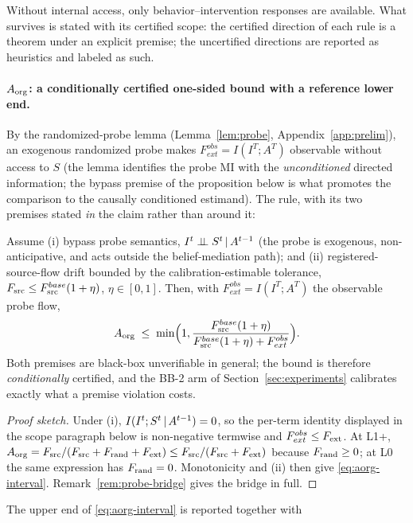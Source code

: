 Without internal access, only behavior--intervention responses are available.
What survives is stated with its certified scope: the certified direction of
each rule is a theorem under an explicit premise; the uncertified directions
are reported as heuristics and labeled as such.

\paragraph{$A_{\mathrm{org}}$: a conditionally certified one-sided bound with a
reference lower end.}
By the randomized-probe lemma
(Lemma~\ref{lem:probe}, Appendix~\ref{app:prelim}), an exogenous randomized
probe makes $F_{ext}^{obs}=I(I^T;A^T)$ observable without access to $S$
(the lemma identifies the probe MI with the \emph{unconditioned} directed
information; the bypass premise of the proposition below is what promotes
the comparison to the causally conditioned estimand). The rule, with its two
premises stated \emph{in} the claim rather than around it:
\begin{proposition}\label{prop:certified-bound}
Assume \textup{(i)} bypass probe semantics, $I^t\perp\!\!\!\perp S^t\,|\, A^{t-1}$
(the probe is exogenous, non-anticipative, and acts outside the
belief-mediation path); and \textup{(ii)} registered-source-flow drift bounded by the
calibration-estimable tolerance, $F_{\mathrm{src}}\le F_{\mathrm{src}}^{base}(1+\eta)$,
$\eta\in[0,1]$. Then, with $F_{ext}^{obs}=I(I^T;A^T)$ the observable probe
flow,
\begin{equation}\label{eq:aorg-interval}
A_{\mathrm{org}}\;\le\;
\min\Bigl(1,\frac{F_{\mathrm{src}}^{base}(1+\eta)}{F_{\mathrm{src}}^{base}(1+\eta)+F_{ext}^{obs}}\Bigr).
\end{equation}
Both premises are black-box unverifiable in general; the bound is therefore
\emph{conditionally} certified, and the BB-2 arm of
Section~\ref{sec:experiments} calibrates exactly what a premise violation
costs.
\end{proposition}
\begin{proof}[Proof sketch]
Under (i), $I(I^t;S^t\,|\, A^{t-1})=0$, so the per-term identity displayed
in the scope paragraph below is non-negative termwise and
$F_{ext}^{obs}\le F_{\mathrm{ext}}$. At L1+,
$A_{\mathrm{org}}=F_{\mathrm{src}}/(F_{\mathrm{src}}+F_{\mathrm{rand}}+F_{\mathrm{ext}})\le F_{\mathrm{src}}/(F_{\mathrm{src}}+F_{\mathrm{ext}})$ because
$F_{\mathrm{rand}}\ge0$; at L0 the same expression has $F_{\mathrm{rand}}=0$. Monotonicity and (ii)
then give \eqref{eq:aorg-interval}.
Remark~\ref{rem:probe-bridge} gives the bridge in full.
\end{proof}
\noindent The upper end of \eqref{eq:aorg-interval} is reported together with
